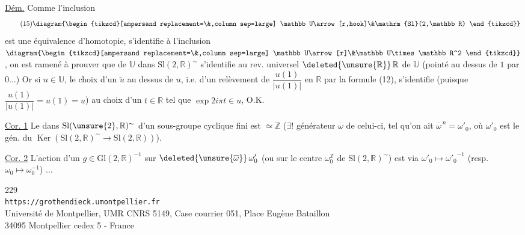 
\uline{Dém.} Comme l'inclusion
\[
\tag{15}
\diagram{\begin{tikzcd}[ampersand replacement=\&,column sep=large]
\mathbb U\arrow[r,hook]\&\mathrm{Sl}(2,\mathbb R)
\end{tikzcd}}
\]
est une équivalence d'homotopie,
 s'identifie 
à l'inclusion
$\diagram{\begin{tikzcd}[ampersand replacement=\&,column sep=large]
\mathbb U\arrow[r]\&\mathbb U\times\mathbb R^2
\end{tikzcd}}$,
on est ramené à prouver que
de $\mathbb U$ dans $\mathrm{Sl}(2,\mathbb R)^{\sim}$
s'identifie au rev. universel
$\deleted{\unsure{\mathbb R}}\,\mathbb R$ de $\mathbb U$
(pointé au dessus de $1$ par $0\ldots$)
Or si $u\in\mathbb U$, le 
choix d'un $\widetilde u$ au dessus de $u$, i.e. d'un relèvement de
$\dfrac{u(1)}{|u(1)|}$ en $\mathbb R$ par la formule (12),
s'identifie (puisque $\dfrac{u(1)}{|u(1)|}=u(1)=u$)
au choix d'un $t\in\mathbb R$ tel que $\exp 2i\pi t\in u$, O.K.

\uline{Cor. 1} Le   dans
$\mathrm{Sl}(\unsure{2},\mathbb R)^{\sim}$ d'un sous-groupe
cyclique fini  est $\simeq\mathbb Z$
($\exists!$ générateur $\overline\omega$ de celui-ci,
tel qu'on ait $\overline\omega^{\,n}=\omega'_0$,
où $\omega'_0$ est le gén. 
du $\operatorname{Ker}(\mathrm{Sl}(2,\mathbb R)^{\sim}
\to\mathrm{Sl}(2,\mathbb R))$).


\uline{Cor. 2} L'action d'un $g\in\mathrm{Gl}(2,\mathbb R)^{-1}$
sur $\deleted{\unsure{\overline\omega}}\,\omega'_0$
(ou sur le centre $\omega_0^{\mathbb Z}$ de
$\mathrm{Sl}(2,\mathbb R)^{\sim}$)
est via $\omega'_0\mapsto{\omega'_0}^{-1}$
(resp. $\omega_0\mapsto\omega_0^{-1}$) $\ldots$


\begin{center}
229\\
\texttt{https://grothendieck.umontpellier.fr}\\
Université de Montpellier, UMR CNRS 5149, Case courrier 051, Place Eugène Bataillon\\
34095 Montpellier cedex 5 - France
\end{center}

